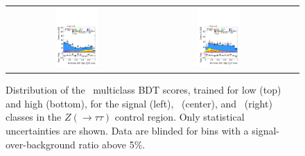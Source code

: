 \begin{figure}[htbp]
\begin{tabular}{ccc}
    \includegraphics[width=0.32\textwidth]{images/sr_cr_plots/plot_tth_ttbar_multiclass_gt200_hh_tth_cr_Ztt.pdf} &
    \includegraphics[width=0.32\textwidth]{images/sr_cr_plots/plot_tth_Z_multiclass_gt200_hh_tth_cr_Ztt.pdf} \\
  \end{tabular}
  
  \caption{Distribution of the \ttH\ multiclass BDT scores, trained for low \pth (top) 
  and high \pth (bottom), for the signal (left), \ttbar\ (center), and \ztautau\ (right) 
  classes in the $Z(\to \tau\tau)$ control region. Only statistical uncertainties are shown. 
  Data are blinded for bins with a signal-over-background ratio above 5\%.}
  \label{fig:bdt_ztt}
  \end{figure}


